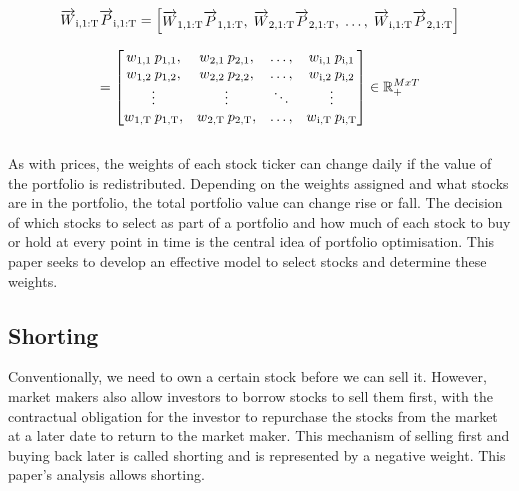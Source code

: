 \documentclass[a4paper,12pt]{report}
\numberwithin{equation}{section}
\theoremstyle{definition}
\begin{document}
\begin{equation*}
  \overrightarrow{W}\textsubscript{i,1:T}\overrightarrow{P}\textsubscript{i,1:T} = 
  \begin{bmatrix}
    \overrightarrow{W}\textsubscript{1,1:T}\overrightarrow{P}\textsubscript{1,1:T},\;
    \overrightarrow{W}\textsubscript{2,1:T}\overrightarrow{P}\textsubscript{2,1:T},\;
    \ldots,\;
    \overrightarrow{W}\textsubscript{i,1:T}\overrightarrow{P}\textsubscript{2,1:T}
  \end{bmatrix}
\end{equation*}

\begin{equation*}
= 
  \begin{bmatrix}
    w\textsubscript{1,1}\:p\textsubscript{1,1},&
    w\textsubscript{2,1}\:p\textsubscript{2,1},&
    \ldots,&
    w\textsubscript{i,1}\:p\textsubscript{i,1} 
    \\
    w\textsubscript{1,2}\:p\textsubscript{1,2},&
    w\textsubscript{2,2}\:p\textsubscript{2,2},&
    \ldots,&
    w\textsubscript{i,2}\:p\textsubscript{i,2}
    \\
    \vdots&\vdots&\ddots&\vdots
    \\
    w\textsubscript{1,T}\:p\textsubscript{1,T},&
    w\textsubscript{2,T}\:p\textsubscript{2,T},&
    \ldots,&
    w\textsubscript{i,T}\:p\textsubscript{i,T}
  \end{bmatrix}
  \in \mathbb{R}_+^{M x T}
\end{equation*}
\\
As with prices, the weights of each stock ticker can change daily if the value of the portfolio is redistributed. Depending on the weights assigned and what stocks are in the portfolio, the total portfolio value can change rise or fall. The decision of which stocks to select as part of a portfolio and how much of each stock to buy or hold at every point in time is the central idea of portfolio optimisation. This paper seeks to develop an effective model to select stocks and determine these weights.

\subsection{Shorting}
Conventionally, we need to own a certain stock before we can sell it. However, market makers also allow investors to borrow stocks to sell them first, with the contractual obligation for the investor to repurchase the stocks from the market at a later date to return to the market maker. This mechanism of selling first and buying back later is called shorting and is represented by a negative weight. This paper's analysis allows shorting.
\end{document}

